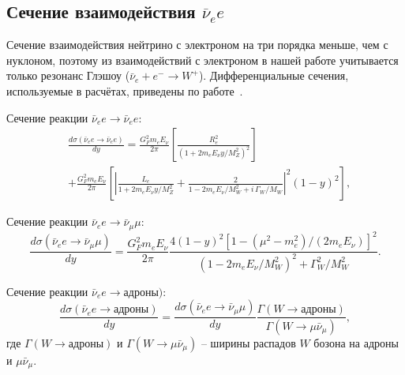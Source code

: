 \subsection{Сечение взаимодействия $\overline{\nu}_e e$}

Сечение взаимодействия нейтрино с электроном на три порядка меньше, чем с нуклоном, поэтому из взаимодействий с электроном в нашей работе учитывается только резонанс Глэшоу ($\bar{\nu}_e + e^- \to W^+$). Дифференциальные сечения, используемые в расчётах, приведены по работе~\cite{GANDHI199681}.

Сечение реакции $\bar{\nu}_e e \to \bar{\nu}_e e$:
\begin{equation}
\begin{aligned}
&\frac{d\sigma(\bar{\nu}_e e \to \bar{\nu}_e e)}{dy} 
= \frac{G_F^2 m_e E_\nu}{2\pi} 
    \left[ 
      \frac{R_e^2}{\left(1 + 2m_e E_\nu y / M_Z^2\right)^2} 
    \right] \\
&+ \frac{G_F^2 m_e E_\nu}{2\pi}
    \left[
      \left|
        \frac{L_e}{1 + 2m_e E_\nu y / M_Z^2}
        + \frac{2}{1 - 2m_e E_\nu / M_W^2 + i\,\Gamma_W / M_W}
      \right|^2 (1 - y)^2
    \right],
\end{aligned}
\end{equation}

Сечение реакции $\bar{\nu}_e e \to \bar{\nu}_\mu \mu$:
\begin{equation}
\frac{d\sigma(\bar{\nu}_e e \to \bar{\nu}_\mu \mu)}{dy} 
= \frac{G_F^2 m_e E_\nu}{2\pi} 
   \frac{
     4(1 - y)^2 \left[ 1 - (\mu^2 - m_e^2)/(2 m_e E_\nu) \right]^2
   }{
     \left(1 - 2m_e E_\nu / M_W^2\right)^2 + \Gamma_W^2 / M_W^2
   }.
\end{equation}

Сечение реакции $\bar{\nu}_e e \to \text{адроны})$:
\begin{equation}
\frac{d\sigma(\bar{\nu}_e e \to \text{адроны})}{dy} =
\frac{d\sigma(\bar{\nu}_e e \to \bar{\nu}_\mu \mu)}{dy}
\frac{\Gamma(W \to \text{адроны})}{\Gamma(W \to \mu \bar{\nu}_\mu)},
\end{equation}
где $\Gamma(W \to \text{адроны})$ и $\Gamma(W \to \mu \bar{\nu}_\mu)$ -- ширины распадов $W$ бозона на адроны и $\mu \bar{\nu}_\mu$.